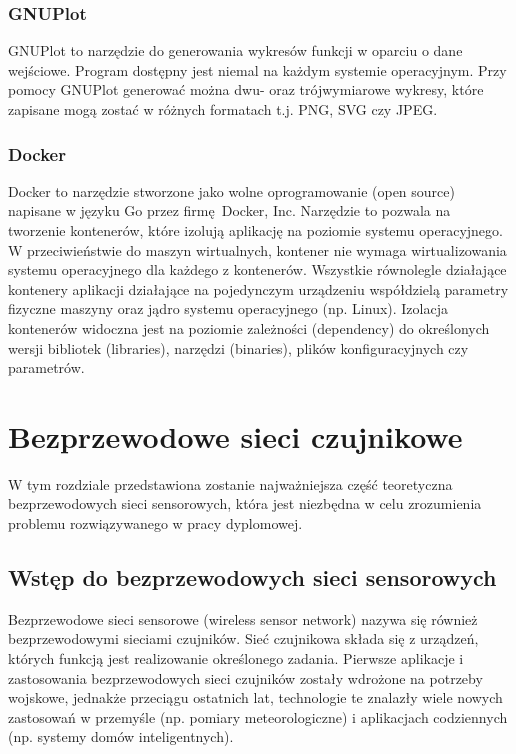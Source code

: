\documentclass[a4paper,12pt,twoside,openany]{report}
\begin{document}
\subsection{GNUPlot}

GNUPlot to narzędzie do generowania wykresów funkcji w oparciu o dane wejściowe. Program dostępny jest niemal na każdym systemie operacyjnym.
Przy pomocy GNUPlot generować można dwu- oraz trójwymiarowe wykresy, które zapisane mogą zostać w różnych formatach t.j. PNG, SVG czy JPEG.

\subsection{Docker}

Docker to narzędzie stworzone jako wolne oprogramowanie (open source) napisane w języku Go przez firmę Docker, Inc.
Narzędzie to pozwala na tworzenie kontenerów, które izolują aplikację na poziomie systemu operacyjnego. W przeciwieństwie do maszyn wirtualnych, kontener nie wymaga
wirtualizowania systemu operacyjnego dla każdego z kontenerów. Wszystkie równolegle działające kontenery aplikacji działające na pojedynczym urządzeniu współdzielą
parametry fizyczne maszyny oraz jądro systemu operacyjnego (np. Linux). Izolacja kontenerów widoczna jest na poziomie zależności (dependency) do określonych wersji
bibliotek (libraries), narzędzi (binaries), plików konfiguracyjnych czy parametrów.

\chapter{Bezprzewodowe sieci czujnikowe}

W tym rozdziale przedstawiona zostanie najważniejsza część teoretyczna bezprzewodowych sieci sensorowych, która jest niezbędna w celu zrozumienia problemu
rozwiązywanego w pracy dyplomowej.

\section{Wstęp do bezprzewodowych sieci sensorowych}
Bezprzewodowe sieci sensorowe (wireless sensor network) nazywa się również bezprzewodowymi sieciami czujników.
Sieć czujnikowa składa się z urządzeń, których funkcją jest realizowanie określonego zadania.
Pierwsze aplikacje i zastosowania bezprzewodowych sieci czujników zostały wdrożone na potrzeby wojskowe, jednakże przeciągu ostatnich lat, technologie te znalazły
wiele nowych zastosowań w przemyśle (np. pomiary meteorologiczne) i aplikacjach codziennych (np. systemy domów inteligentnych).
\end{document}
